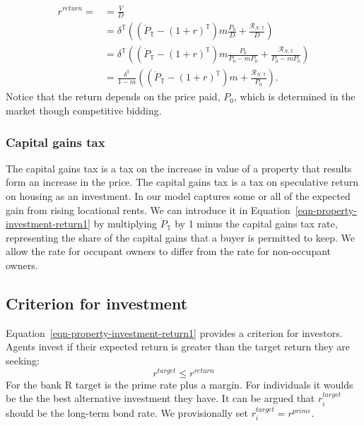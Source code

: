 \begin{align}
r^{return} =
  &= \frac{V}{D}  \nonumber \\
  &= \delta^\mathbb{T} \left((\dot P_\mathbb{T} - (1+r)^\mathbb{T})m \frac{P_0}{D} + \frac{\mathcal{R}_{N, \mathbb{T}}}{D}\right) \nonumber \\
   &= \delta^\mathbb{T} \left((\dot P_\mathbb{T} - (1+r)^\mathbb{T})m \frac{P_0}{P_0-mP_0} + \frac{\mathcal{R}_{N, \mathbb{T}}}{P_0-mP_0}\right) \nonumber \\
  &= \frac{\delta^\mathbb{T}}{1-m} \left((\dot P_\mathbb{T} - (1+r)^\mathbb{T})m  + \frac{\mathcal{R}_{N, \mathbb{T}}}{P_0}\right).\label{eqn-property-investment-return1} 
\end{align}
Notice that the return depends on the price paid, $P_0$, which is determined in the market though competitive bidding.

\subsubsection{Capital gains tax}
The \gls{capital gains tax} is %
a tax on the increase in value of a property that results form an increase in the price. The capital gains tax is a tax on speculative return on housing as an investment. In our model captures some or all of the expected gain from rising locational rents. We can introduce it in Equation~\ref{eqn-property-investment-return1} by multiplying $\dot P_\mathbb{T}$ by 1 minus the capital gains tax rate, representing the share of the capital gains that a buyer is permitted to keep. We allow the rate for occupant owners to differ from the rate for non-occupant owners.


\subsection{Criterion for investment}
Equation~\ref{eqn-property-investment-return1} provides a criterion for investors. %
 Agents invest if  their expected return is greater than the target return they are seeking:
\begin{equation}
r^{target}\le r^{return} 
\label{eqn-property-investment-return2}
\end{equation}
For the bank R target is the prime rate plus a margin. For individuals it woulds be the the best alternative investment they have. It can be argued that  $r^{target}_i$ should be the long-term bond rate. We provisionally set $r^{target}_i=r^{prime}$.

